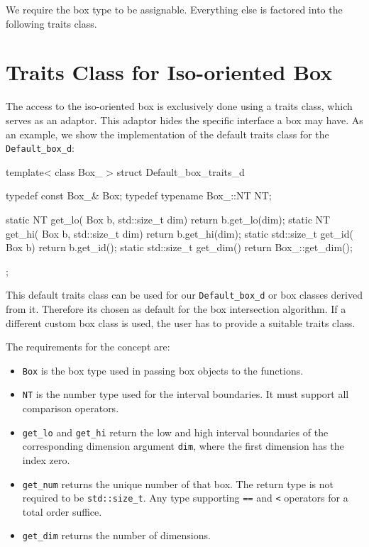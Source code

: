 {We require the box type to be assignable. Everything else is 
factored into the following traits class.

\section{Traits Class for Iso-oriented Box}

The access to the iso-oriented box is exclusively done using a 
traits class, which serves as an adaptor. This adaptor hides the
specific interface a box may have. As an example, we show the
implementation of the default traits class for the
\texttt{Default\_box\_d}:

\begin{ccExampleCode}
template< class Box_ >
struct Default_box_traits_d {
    typedef const Box_&       Box;
    typedef typename Box_::NT NT;

    static NT          get_lo( Box b, std::size_t dim) { return b.get_lo(dim);  }
    static NT          get_hi( Box b, std::size_t dim) { return b.get_hi(dim);  }
    static std::size_t get_id( Box b)                  { return b.get_id();     }
    static std::size_t get_dim()                       { return Box_::get_dim();}
};
\end{ccExampleCode}

This default traits class can be used for our \texttt{Default\_box\_d}
or box classes derived from it. Therefore its chosen as default for
the box intersection algorithm. If a different custom box class is
used, the user has to provide a suitable traits class.

The requirements for the  concept are:
\begin{itemize}
    \item 
      \texttt{Box} is the box type used in passing box objects to the
      functions.
    \item
      \texttt{NT} is the number type used for the interval
      boundaries. It must support all comparison operators.
    \item 
      \texttt{get\_lo} and \texttt{get\_hi} return the low and high
      interval boundaries of the corresponding dimension argument
      \texttt{dim}, where the first  dimension has the index zero.
    \item 
      \texttt{get\_num} returns the unique number of that box. The
      return type is not required to be \texttt{std::size\_t}. Any
      type supporting \texttt{==} and \texttt{<} operators for a total
      order suffice.
    \item
      \texttt{get\_dim} returns the number of dimensions. 
\end{itemize}

}
